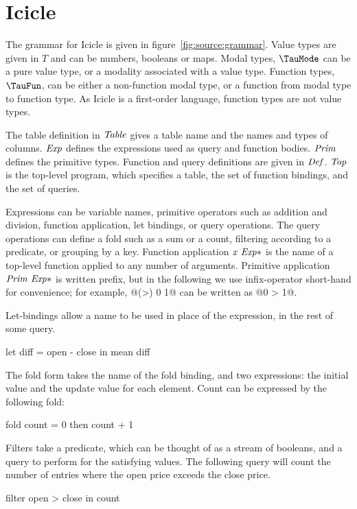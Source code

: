 \section{Icicle}
\label{s:IcicleSource}





The grammar for Icicle is given in figure~\ref{fig:source:grammar}.
Value types are given in $T$ and can be numbers, booleans or maps.
Modal types, $\TauMode$ can be a pure value type, or a modality associated with a value type.
Function types, $\TauFun$, can be either a non-function modal type, or a function from modal type to function type.
As Icicle is a first-order language, function types are not value types.

The table definition in $\mathit{Table}$ gives a table name and the names and types of columns.
$\mathit{Exp}$ defines the expressions used as query and function bodies.
$\mathit{Prim}$ defines the primitive types.
Function and query definitions are given in $\mathit{Def}$.
$\mathit{Top}$ is the top-level program, which specifies a table, the set of function bindings, and the set of queries.

Expressions can be variable names, primitive operators such as addition and division, function application, let bindings, or query operations.
The query operations can define a fold such as a sum or a count, filtering according to a predicate, or grouping by a key.
Function application $\mathit{x~Exp*}$ is the name of a top-level function applied to any number of arguments.
Primitive application $\mathit{Prim~Exp*}$ is written prefix, but in the following we use infix-operator short-hand for convenience; for example, @(>) 0 1@ can be written as @0 > 1@.

Let-bindings allow a name to be used in place of the expression, in the rest of some query.
\begin{code}
let diff = open - close
in  mean diff
\end{code}

The fold form takes the name of the fold binding, and two expressions: the initial value and the update value for each element.
Count can be expressed by the following fold:
\begin{code}
fold count = 0 then count + 1
\end{code}

Filters take a predicate, which can be thought of as a stream of booleans, and a query to perform for the satisfying values.
The following query will count the number of entries where the open price exceeds the close price.
\begin{code}
filter open > close in count
\end{code}

